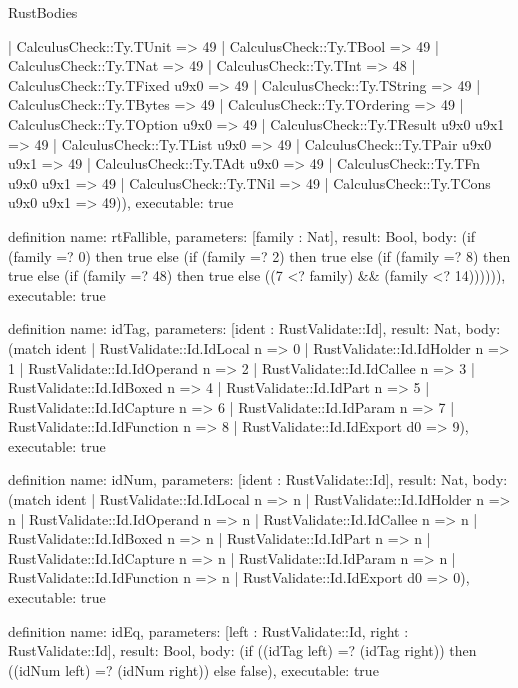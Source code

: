 \begin{lexlean}{RustBodies}
\begin{semanticmodule}
{      | CalculusCheck::Ty.TUnit => 49
      | CalculusCheck::Ty.TBool => 49
      | CalculusCheck::Ty.TNat => 49
      | CalculusCheck::Ty.TInt => 48
      | CalculusCheck::Ty.TFixed u9x0 => 49
      | CalculusCheck::Ty.TString => 49
      | CalculusCheck::Ty.TBytes => 49
      | CalculusCheck::Ty.TOrdering => 49
      | CalculusCheck::Ty.TOption u9x0 => 49
      | CalculusCheck::Ty.TResult u9x0 u9x1 => 49
      | CalculusCheck::Ty.TList u9x0 => 49
      | CalculusCheck::Ty.TPair u9x0 u9x1 => 49
      | CalculusCheck::Ty.TAdt u9x0 => 49
      | CalculusCheck::Ty.TFn u9x0 u9x1 => 49
      | CalculusCheck::Ty.TNil => 49
      | CalculusCheck::Ty.TCons u9x0 u9x1 => 49)),
  executable: true
}

definition{
  name: rtFallible,
  parameters: [family : Nat],
  result: Bool,
  body: (if (family =? 0) then true else (if (family =? 2) then true else (if (family =? 8) then true else (if (family =? 48) then true else ((7 <? family) && (family <? 14)))))),
  executable: true
}

definition{
  name: idTag,
  parameters: [ident : RustValidate::Id],
  result: Nat,
  body: (match ident
    | RustValidate::Id.IdLocal n => 0
    | RustValidate::Id.IdHolder n => 1
    | RustValidate::Id.IdOperand n => 2
    | RustValidate::Id.IdCallee n => 3
    | RustValidate::Id.IdBoxed n => 4
    | RustValidate::Id.IdPart n => 5
    | RustValidate::Id.IdCapture n => 6
    | RustValidate::Id.IdParam n => 7
    | RustValidate::Id.IdFunction n => 8
    | RustValidate::Id.IdExport d0 => 9),
  executable: true
}

definition{
  name: idNum,
  parameters: [ident : RustValidate::Id],
  result: Nat,
  body: (match ident
    | RustValidate::Id.IdLocal n => n
    | RustValidate::Id.IdHolder n => n
    | RustValidate::Id.IdOperand n => n
    | RustValidate::Id.IdCallee n => n
    | RustValidate::Id.IdBoxed n => n
    | RustValidate::Id.IdPart n => n
    | RustValidate::Id.IdCapture n => n
    | RustValidate::Id.IdParam n => n
    | RustValidate::Id.IdFunction n => n
    | RustValidate::Id.IdExport d0 => 0),
  executable: true
}

definition{
  name: idEq,
  parameters: [left : RustValidate::Id, right : RustValidate::Id],
  result: Bool,
  body: (if ((idTag left) =? (idTag right)) then ((idNum left) =? (idNum right)) else false),
  executable: true
}


\end{semanticmodule}
\end{lexlean}
